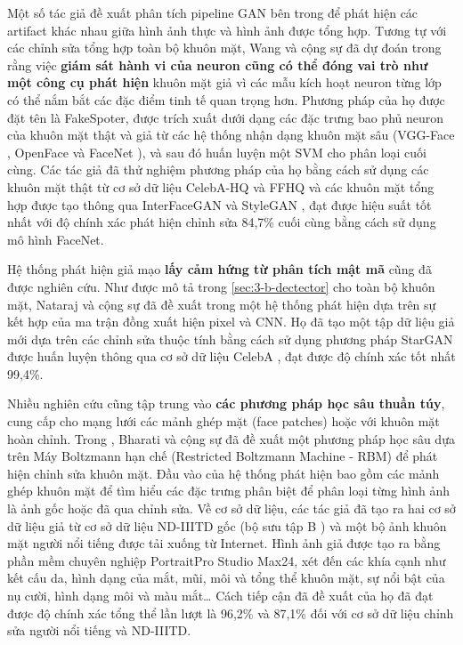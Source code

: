 \documentclass{article}
\begin{document}
Một số tác giả đề xuất phân tích pipeline GAN bên trong để phát hiện các artifact khác nhau giữa hình ảnh thực và hình ảnh được tổng hợp. Tương tự với các chỉnh sửa tổng hợp toàn bộ khuôn mặt, Wang và cộng sự đã dự đoán trong  rằng việc \textbf{giám sát hành vi của neuron cũng có thể đóng vai trò như một công cụ phát hiện} khuôn mặt giả vì các mẫu kích hoạt neuron từng lớp có thể nắm bắt các đặc điểm tinh tế quan trọng hơn. Phương pháp của họ được đặt tên là FakeSpoter, được trích xuất dưới dạng các đặc trưng bao phủ neuron của khuôn mặt thật và giả từ các hệ thống nhận dạng khuôn mặt sâu (VGG-Face , OpenFace  và FaceNet ), và sau đó huấn luyện một SVM cho phân loại cuối cùng. Các tác giả đã thử nghiệm phương pháp của họ bằng cách sử dụng các khuôn mặt thật từ cơ sở dữ liệu CelebA-HQ  và FFHQ  và các khuôn mặt tổng hợp được tạo thông qua InterFaceGAN  và StyleGAN , đạt được hiệu suất tốt nhất với độ chính xác phát hiện chỉnh sửa 84,7\% cuối cùng bằng cách sử dụng mô hình FaceNet.

Hệ thống phát hiện giả mạo \textbf{lấy cảm hứng từ phân tích mật mã} cũng đã được nghiên cứu. Như được mô tả trong \ref{sec:3-b-dectector} cho toàn bộ khuôn mặt, Nataraj và cộng sự đã đề xuất trong  một hệ thống phát hiện dựa trên sự kết hợp của ma trận đồng xuất hiện pixel và CNN. Họ đã tạo một tập dữ liệu giả mới dựa trên các chỉnh sửa thuộc tính bằng cách sử dụng phương pháp StarGAN  được huấn luyện thông qua cơ sở dữ liệu CelebA , đạt được độ chính xác tốt nhất 99,4\%.

Nhiều nghiên cứu cũng tập trung vào \textbf{các phương pháp học sâu thuần túy}, cung cấp cho mạng lưới các mảnh ghép mặt (face patches) hoặc với khuôn mặt hoàn chỉnh. Trong , Bharati và cộng sự đã đề xuất một phương pháp học sâu dựa trên Máy Boltzmann hạn chế (Restricted Boltzmann Machine - RBM) để phát hiện chỉnh sửa khuôn mặt. Đầu vào của hệ thống phát hiện bao gồm các mảnh ghép khuôn mặt để tìm hiểu các đặc trưng phân biệt để phân loại từng hình ảnh là ảnh gốc hoặc đã qua chỉnh sửa. Về cơ sở dữ liệu, các tác giả đã tạo ra hai cơ sở dữ liệu giả từ cơ sở dữ liệu ND-IIITD gốc (bộ sưu tập B ) và một bộ ảnh khuôn mặt người nổi tiếng được tải xuống từ Internet. Hình ảnh giả được tạo ra bằng phần mềm chuyên nghiệp PortraitPro Studio Max24, xét đến các khía cạnh như kết cấu da, hình dạng của mắt, mũi, môi và tổng thể khuôn mặt, sự nổi bật của nụ cười, hình dạng môi và màu mắt… Cách tiếp cận đã đề xuất của họ đã đạt được độ chính xác tổng thể lần lượt là 96,2\% và 87,1\% đối với cơ sở dữ liệu chỉnh sửa người nổi tiếng và ND-IIITD.
\end{document}
